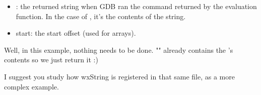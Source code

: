 \begin{itemize}
\item {}: the returned string when GDB ran the command returned by the evaluation function. In the case of , it's the contents of the string.
\item start: the start offset (used for arrays).
\end{itemize}

Well, in this example, nothing needs to be done. "" already contains the 's contents so we just return it :)

I suggest you study how wxString is registered in that same file, as a more complex example. 
